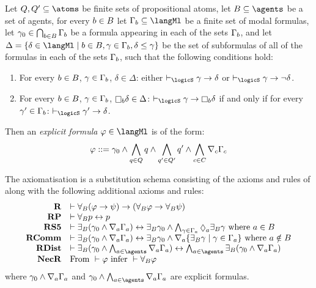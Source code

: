 \begin{definition}
Let $\atomsQ, \atomsQ' \subseteq \atoms$ be finite sets of propositional atoms,
let $\agentsB \subseteq \agents$ be a set of agents,
for every $b \in B$ let $\Gamma_\agentB \subseteq \langMl$ be a finite set of modal formulas,
let $\gamma_0 \in \bigcap_{b \in B} \Gamma_b$ be a formula appearing in each of the sets $\Gamma_b$, and
let $\Delta = \{\delta \in \langMl \mid \agentB \in \agentsB, \gamma \in \Gamma_\agentB, \delta \leq \gamma\}$ be the set of subformulas of all of the formulas in each of the sets $\Gamma_b$,
such that the following conditions hold:
\begin{enumerate}
    \item For every $b \in B$, $\gamma \in \Gamma_b$, $\delta \in \Delta$: either $\proves_\logicS \gamma \implies \delta$ or $\proves_\logicS \gamma \implies \lnot \delta$.
    \item For every $b \in B$, $\gamma \in \Gamma_b$, $\necessaryB \delta \in \Delta$: $\proves_\logicS \gamma \implies \necessaryB \delta$ if and only if for every $\gamma' \in \Gamma_b$: $\proves_\logicS \gamma' \implies \delta$.
\end{enumerate}
Then an {\em explicit formula} $\phi \in \langMl$ is of the form:
$$
\varphi ::= \gamma_0 \land \bigwedge_{q \in Q} q \land \bigwedge_{q' \in Q'} q' \land \bigwedge_{c \in C} \nabla_{c} \Gamma_c
$$
\end{definition}

\begin{definition}
    The axiomatisation \axiomRmlS{} is a substitution schema consisting of the axioms and rules of \axiomS{} along with the following additional axioms and rules:
$$
\begin{array}{rl}
    {\bf R} & \proves \allrefsBs (\phi \implies \psi) \implies (\allrefsBs \phi \implies \allrefsBs \psi)\\
    {\bf RP} & \proves \allrefsBs \atomP \iff \atomP\\
    {\bf RS5} & \proves \somerefsBs (\gamma_0 \land \coversA \Gamma_\agentA) \iff \somerefsBs \gamma_0 \land \bigwedge_{\gamma \in \Gamma_\agentA} \possibleA \somerefsBs \gamma \text{ where } \agentA \in \agentsB\\
    {\bf RComm} & \proves \somerefsBs (\gamma_0 \land \coversA \Gamma_\agentA) \iff \somerefsBs \gamma_0 \land \coversA \{\somerefsBs \gamma \mid \gamma \in \Gamma_\agentA\} \text{ where } \agentA \notin \agentsB\\
    {\bf RDist} & \proves \somerefsBs (\gamma_0 \land \bigwedge_{\agentA \in \agents} \coversA \Gamma_\agentA) \iff \bigwedge_{\agentA \in \agents} \somerefsBs (\gamma_0 \land \coversA \Gamma_\agentA)\\
    {\bf NecR} & \text{From } \proves \phi \text{ infer } \proves \allrefsBs \phi
\end{array}
$$
where $\gamma_0 \land \nabla_{a} \Gamma_a$ and $\gamma_0 \land \bigwedge_{\agentA \in \agents} \coversA \Gamma_\agentA$ are explicit formulas.
\end{definition}

